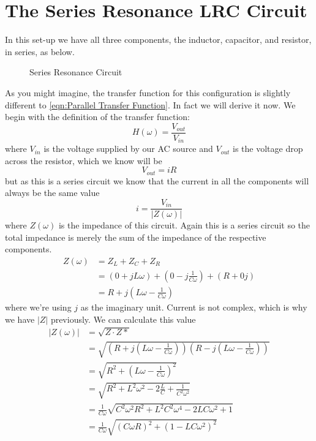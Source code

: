 \documentclass[12pt]{article}
\numberwithin{equation}{section}
\numberwithin{figure}{section}
\begin{document}
    \section{The Series Resonance LRC Circuit}\label{sec:Series Resonance}
    In this set-up we have all three components, the inductor, capacitor, and resistor, in series, as 
    below.
    \begin{figure}[H]
        \centering
            \def\svgwidth{0.5\textwidth}
            
            \caption{Series Resonance Circuit}
            \label{fig:Series Resonance Circuit}
    \end{figure}
    As you might imagine, the transfer function for this configuration is slightly different to 
    \autoref{eqn:Parallel Transfer Function}. In fact we will derive it now. \newline \newline
    We begin with the definition of the transfer function:
    \begin{equation*}
        H(\omega)=\frac{V_{out}}{V_{in}}
    \end{equation*}
    where $V_{in}$ is the voltage supplied by our AC source and $V_{out}$ is the voltage drop across 
    the resistor, which we know will be 
    \begin{equation*}
        V_{out}=iR
    \end{equation*}
    but as this is a series circuit we know that the current in all the components will always be the 
    same value
    \begin{equation*}
        i=\frac{V_{in}}{|Z(\omega)|}
    \end{equation*}
    where $Z(\omega)$ is the impedance of this circuit. Again this is a series circuit so the total 
    impedance is merely the sum of the impedance of the respective components.
    \begin{align*}
        Z(\omega)&=Z_L+Z_C+Z_R\\
        &=(0+jL\omega)+(0-j\frac{1}{C\omega})+(R+0j)\\
        &=R+j(L\omega-\frac{1}{C\omega})
    \end{align*}
    where we're using $j$ as the imaginary unit. Current is not complex, which is why we have $|Z|$ 
    previously. We can calculate this value
    \begin{align*}
        |Z(\omega)|&=\sqrt{Z\cdot Z*}\\
        &=\sqrt{(R+j(L\omega-\frac{1}{C\omega}))(R-j(L\omega-\frac{1}{C\omega}))}\\
        &=\sqrt{R^2+(L\omega-\frac{1}{C\omega})^2}\\
        &=\sqrt{R^2+L^2\omega^2-2\frac{L}{C}+\frac{1}{C^2\omega^2}}\\
        &=\frac{1}{C\omega}\sqrt{C^2\omega^2R^2+L^2C^2\omega^4-2LC\omega^2+1}\\
        &=\frac{1}{C\omega}\sqrt{(C\omega R)^2+(1-LC\omega^2)^2}
    \end{align*}
\end{document}
